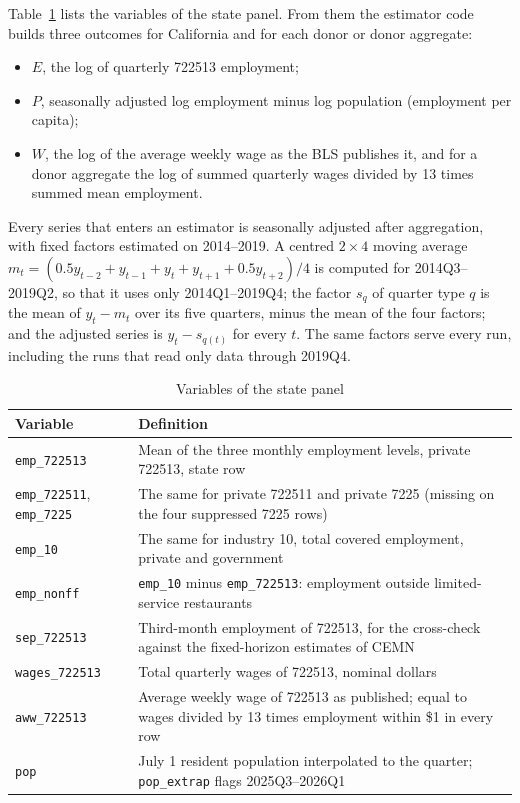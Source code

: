 Table~\ref{tab:variables} lists the variables of the state panel. From them the estimator code
builds three outcomes for California and for each donor or donor aggregate:
\begin{itemize}
  \item $E$, the log of quarterly 722513 employment;
  \item $P$, seasonally adjusted log employment minus log population (employment per capita);
  \item $W$, the log of the average weekly wage as the BLS publishes it, and for a donor
        aggregate the log of summed quarterly wages divided by 13 times summed mean employment.
\end{itemize}
Every series that enters an estimator is seasonally adjusted after aggregation, with fixed
factors estimated on 2014--2019. A centred $2\times4$ moving average
$m_t = (0.5y_{t-2} + y_{t-1} + y_t + y_{t+1} + 0.5y_{t+2})/4$ is computed for 2014Q3--2019Q2, so
that it uses only 2014Q1--2019Q4; the factor $s_q$ of quarter type $q$ is the mean of $y_t - m_t$
over its five quarters, minus the mean of the four factors; and the adjusted series is
$y_t - s_{q(t)}$ for every $t$. The same factors serve every run, including the runs that read
only data through 2019Q4.

\begin{table}[tbp]
\centering
\caption{Variables of the state panel}
\label{tab:variables}
\small
\begin{tabularx}{\linewidth}{@{}l>{\raggedright\arraybackslash}X@{}}
\toprule
Variable & Definition \\
\midrule
\texttt{emp\_722513} & Mean of the three monthly employment levels, private 722513, state row \\
\texttt{emp\_722511}, \texttt{emp\_7225} & The same for private 722511 and private 7225 (missing on the four suppressed 7225 rows) \\
\texttt{emp\_10} & The same for industry 10, total covered employment, private and government \\
\texttt{emp\_nonff} & \texttt{emp\_10} minus \texttt{emp\_722513}: employment outside limited-service restaurants \\
\texttt{sep\_722513} & Third-month employment of 722513, for the cross-check against the fixed-horizon estimates of CEMN \\
\texttt{wages\_722513} & Total quarterly wages of 722513, nominal dollars \\
\texttt{aww\_722513} & Average weekly wage of 722513 as published; equal to wages divided by 13 times employment within \$1 in every row \\
\texttt{pop} & July 1 resident population interpolated to the quarter; \texttt{pop\_extrap} flags 2025Q3--2026Q1 \\
\bottomrule
\end{tabularx}
\end{table}

